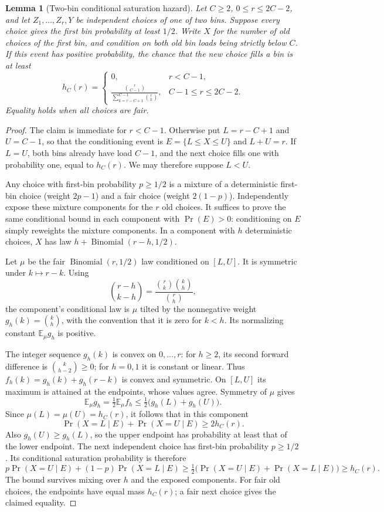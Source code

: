 \documentclass[11pt]{article}
\newtheorem{lemma}{Lemma}
\begin{document}
\begin{lemma}[Two-bin conditional saturation hazard]\label{lem:twohazard}
Let $C\geq2$, $0\leq r\leq2C-2$, and let $Z_1,\ldots,Z_r,Y$ be
independent choices of one of two bins. Suppose every choice gives the
first bin probability at least $1/2$. Write $X$ for the number of old
choices of the first bin, and condition on both old bin loads being
strictly below $C$. If this event has positive probability, the chance
that the new choice fills a bin is at least
\[
 h_C(r)=
 \begin{cases}
 0,&r<C-1,\\[2pt]
 \displaystyle\frac{\binom r{C-1}}
 {\sum_{k=r-C+1}^{C-1}\binom rk},&C-1\leq r\leq2C-2.
 \end{cases}
\]
Equality holds when all choices are fair.
\end{lemma}
\begin{proof}
The claim is immediate for $r<C-1$. Otherwise put $L=r-C+1$ and
$U=C-1$, so that the conditioning event is $E=\{L\leq X\leq U\}$
and $L+U=r$. If $L=U$, both bins already have load $C-1$, and the
next choice fills one with probability one, equal to $h_C(r)$.
We may therefore suppose $L<U$.

Any choice with first-bin probability $p\geq1/2$ is a mixture of a
deterministic first-bin choice (weight $2p-1$) and a fair choice
(weight $2(1-p)$). Independently expose these mixture components for
the $r$ old choices. It suffices to prove the same conditional bound in
each component with $\Pr(E)>0$: conditioning on $E$ simply reweights
the mixture components. In a component with $h$ deterministic choices,
$X$ has law $h+\operatorname{Binomial}(r-h,1/2)$.

Let $\mu$ be the fair $\operatorname{Binomial}(r,1/2)$ law conditioned
on $[L,U]$. It is symmetric under $k\mapsto r-k$. Using
\[
 \binom{r-h}{k-h}=\frac{\binom rk\binom kh}{\binom rh},
\]
the component's conditional law is $\mu$ tilted by the nonnegative
weight $g_h(k)=\binom kh$, with the convention that it is zero for
$k<h$. Its normalizing constant $\mathbb E_\mu g_h$ is positive.

The integer sequence $g_h(k)$ is convex on $0,\ldots,r$:
for $h\geq2$, its second forward difference is $\binom k{h-2}\geq0$;
for $h=0,1$ it is constant or linear. Thus
$f_h(k)=g_h(k)+g_h(r-k)$ is convex and symmetric. On $[L,U]$ its
maximum is attained at the endpoints, whose values agree. Symmetry of
$\mu$ gives
\[
 \mathbb E_\mu g_h
 =\tfrac12\mathbb E_\mu f_h
 \leq\tfrac12\bigl(g_h(L)+g_h(U)\bigr).
\]
Since $\mu(L)=\mu(U)=h_C(r)$, it follows that in this component
\[
 \Pr(X=L\mid E)+\Pr(X=U\mid E)\geq2h_C(r).
\]
Also $g_h(U)\geq g_h(L)$, so the upper endpoint has probability at
least that of the lower endpoint. The next independent choice has
first-bin probability $p\geq1/2$. Its conditional saturation probability
is therefore
\[
 p\Pr(X=U\mid E)+(1-p)\Pr(X=L\mid E)
 \geq\tfrac12\bigl(\Pr(X=U\mid E)+\Pr(X=L\mid E)\bigr)
 \geq h_C(r).
\]
The bound survives mixing over $h$ and the exposed components.
For fair old choices, the endpoints have equal mass $h_C(r)$;
a fair next choice gives the claimed equality.
\end{proof}
\end{document}
